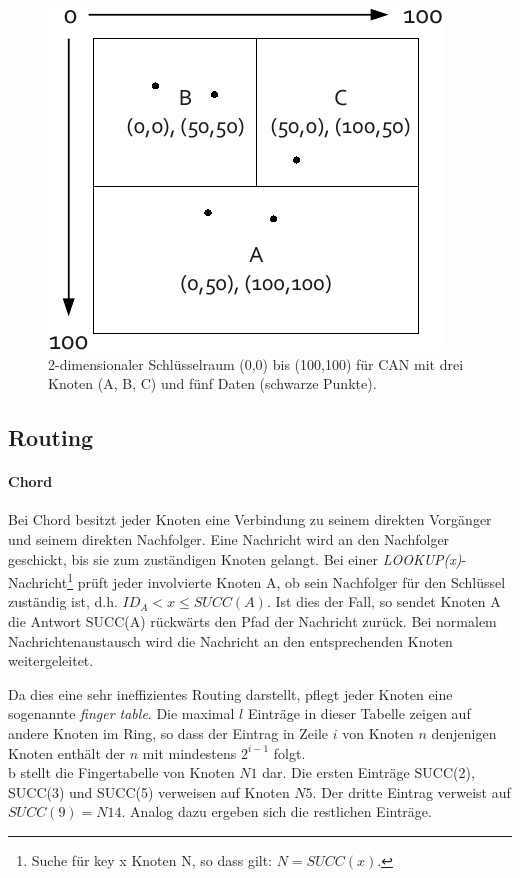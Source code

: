 \begin{figure}[htb]
\centering
\includegraphics{grafics/can_key_space.pdf}
\caption{2-dimensionaler Schlüsselraum (0,0) bis (100,100) für CAN mit drei Knoten (A, B, C) und fünf Daten (schwarze Punkte).}
\label{fig:can_key_space}
\end{figure}


\subsection{Routing}
\paragraph{Chord}
Bei Chord besitzt jeder Knoten eine Verbindung zu seinem direkten Vorgänger und seinem direkten Nachfolger. Eine Nachricht wird an den Nachfolger geschickt, bis sie zum zuständigen Knoten gelangt. Bei einer \emph{LOOKUP(x)}-Nachricht\footnote{Suche für key x Knoten N, so dass gilt: $N = SUCC(x)$.} prüft jeder involvierte Knoten A, ob sein Nachfolger für den Schlüssel zuständig ist, d.h. $ID_A < x \le SUCC(A)$. Ist dies der Fall, so sendet Knoten A die Antwort SUCC(A) rückwärts den Pfad der Nachricht zurück. Bei normalem Nachrichtenaustausch wird die Nachricht an den entsprechenden Knoten weitergeleitet.

Da dies eine sehr ineffizientes  Routing darstellt, pflegt jeder Knoten eine sogenannte \emph{finger table}. Die maximal $l$ Einträge in dieser Tabelle zeigen auf andere Knoten im Ring, so dass der Eintrag in Zeile $i$ von Knoten $n$ denjenigen Knoten enthält der $n$ mit mindestens $2^{i-1}$ folgt.\\
 b stellt die Fingertabelle von Knoten $N1$ dar. Die ersten Einträge SUCC(2), SUCC(3) und SUCC(5) verweisen auf Knoten $N5$. Der dritte Eintrag verweist auf $SUCC(9) = N14$. Analog dazu ergeben sich die restlichen Einträge.

